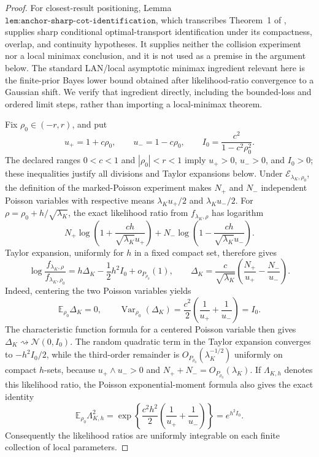 \documentclass{article}
\begin{document}
\begin{proof}
For closest-result positioning, Lemma
\(\texttt{lem:anchor-sharp-cot-identification}\), which transcribes
Theorem~1 of \cite{linGaoBlanchetGlynn2026Causal}, supplies sharp
conditional optimal-transport identification under its compactness,
overlap, and continuity hypotheses.  It supplies neither the collision
experiment nor a local minimax conclusion, and it is not used as a
premise in the argument below.  The standard LAN/local asymptotic
minimax ingredient relevant here is the finite-prior Bayes lower bound
obtained after likelihood-ratio convergence to a Gaussian shift.  We
verify that ingredient directly, including the bounded-loss and ordered
limit steps, rather than importing a local-minimax theorem.

Fix \(\rho_0\in(-r,r)\), and put
\[
 u_+=1+c\rho_0,\qquad
 u_-=1-c\rho_0,\qquad
 I_0=\frac{c^2}{1-c^2\rho_0^2}.
 \tag{70}
\]
The declared ranges \(0<c<1\) and \(|\rho_0|<r<1\) imply
\(u_+>0\), \(u_->0\), and \(I_0>0\); these inequalities justify all
divisions and Taylor expansions below.  Under
\(\mathcal E_{\lambda_K,\rho_0}\), the definition of the marked-Poisson
experiment makes \(N_+\) and \(N_-\) independent Poisson variables
with respective means \(\lambda_Ku_+/2\) and
\(\lambda_Ku_-/2\).  For
\(\rho=\rho_0+h/\sqrt{\lambda_K}\), the exact likelihood ratio from
\(f_{\lambda_K,\rho}\) has logarithm
\[
 N_+\log\!\left(1+\frac{ch}{\sqrt{\lambda_K}u_+}\right)
 +N_-\log\!\left(1-\frac{ch}{\sqrt{\lambda_K}u_-}\right).
\]
Taylor expansion, uniformly for \(h\) in a fixed compact set, therefore
gives
\[
 \log\frac{f_{\lambda_K,\rho}}
 {f_{\lambda_K,\rho_0}}
 =h\Delta_K-\frac12h^2I_0+o_{P_{\rho_0}}(1),
 \qquad
 \Delta_K=\frac c{\sqrt{\lambda_K}}
 \left(\frac{N_+}{u_+}-\frac{N_-}{u_-}\right).
 \tag{71}
\]
Indeed, centering the two Poisson variables yields
\[
 \mathbb E_{\rho_0}\Delta_K=0,
 \qquad
 \operatorname{Var}_{\rho_0}(\Delta_K)
 =\frac{c^2}{2}\left(\frac1{u_+}+\frac1{u_-}\right)
 =I_0.
 \tag{72}
\]
The characteristic function formula for a centered Poisson variable
then gives \(\Delta_K\rightsquigarrow\mathcal N(0,I_0)\).  The random
quadratic term in the Taylor expansion converges to
\(-h^2I_0/2\), while the third-order remainder is
\(O_{P_{\rho_0}}(\lambda_K^{-1/2})\) uniformly on compact
\(h\)-sets, because \(u_+\wedge u_->0\) and
\(N_++N_-=O_{P_{\rho_0}}(\lambda_K)\).  If
\(\Lambda_{K,h}\) denotes this likelihood ratio, the Poisson
exponential-moment formula also gives the exact identity
\[
 \mathbb E_{\rho_0}\Lambda_{K,h}^2
 =\exp\!\left\{
 \frac{c^2h^2}{2}
 \left(\frac1{u_+}+\frac1{u_-}\right)\right\}
 =e^{h^2I_0}.
 \tag{73}
\]
Consequently the likelihood ratios are uniformly integrable on each
finite collection of local parameters.


\end{proof}
\end{document}
